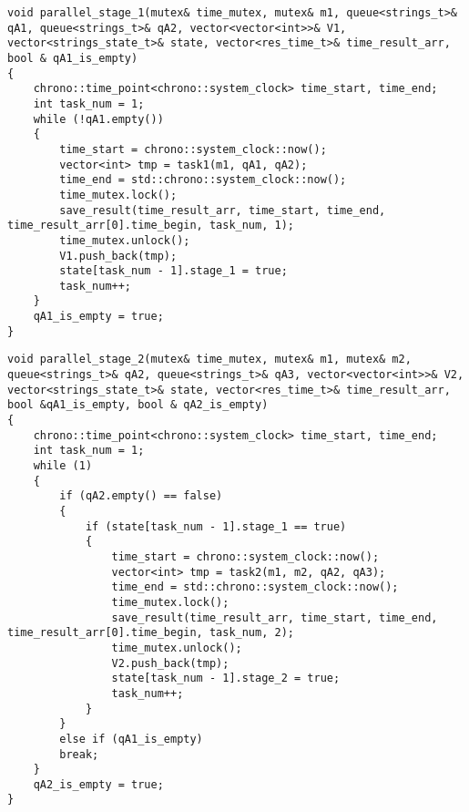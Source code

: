 \begin{center}
\captionsetup{justification=raggedright,singlelinecheck=off}
\begin{lstlisting}[label=lst:parallel_stage_1,caption=Функция 1-ой ленты конвейерной обработки строки]
void parallel_stage_1(mutex& time_mutex, mutex& m1, queue<strings_t>& qA1, queue<strings_t>& qA2, vector<vector<int>>& V1, vector<strings_state_t>& state, vector<res_time_t>& time_result_arr, bool & qA1_is_empty)
{
	chrono::time_point<chrono::system_clock> time_start, time_end;
	int task_num = 1;
	while (!qA1.empty())
	{
		time_start = chrono::system_clock::now();
		vector<int> tmp = task1(m1, qA1, qA2);
		time_end = std::chrono::system_clock::now();
		time_mutex.lock();
		save_result(time_result_arr, time_start, time_end, time_result_arr[0].time_begin, task_num, 1);
		time_mutex.unlock();
		V1.push_back(tmp);
		state[task_num - 1].stage_1 = true;
		task_num++;
	}
	qA1_is_empty = true;
}
\end{lstlisting}
\end{center}

\begin{center}
\captionsetup{justification=raggedright,singlelinecheck=off}
\begin{lstlisting}[label=lst:parallel_stage_2,caption=Функция 2-ой ленты конвейерной обработки строки]
void parallel_stage_2(mutex& time_mutex, mutex& m1, mutex& m2, queue<strings_t>& qA2, queue<strings_t>& qA3, vector<vector<int>>& V2, vector<strings_state_t>& state, vector<res_time_t>& time_result_arr, bool &qA1_is_empty, bool & qA2_is_empty)
{
	chrono::time_point<chrono::system_clock> time_start, time_end;
	int task_num = 1;
	while (1)
	{
		if (qA2.empty() == false)
		{
			if (state[task_num - 1].stage_1 == true)
			{
				time_start = chrono::system_clock::now();
				vector<int> tmp = task2(m1, m2, qA2, qA3);
				time_end = std::chrono::system_clock::now();
				time_mutex.lock();
				save_result(time_result_arr, time_start, time_end, time_result_arr[0].time_begin, task_num, 2);
				time_mutex.unlock();
				V2.push_back(tmp);
				state[task_num - 1].stage_2 = true;
				task_num++;
			}
		}
		else if (qA1_is_empty)
		break;
	}
	qA2_is_empty = true;
}
\end{lstlisting}
\end{center}

\clearpage

